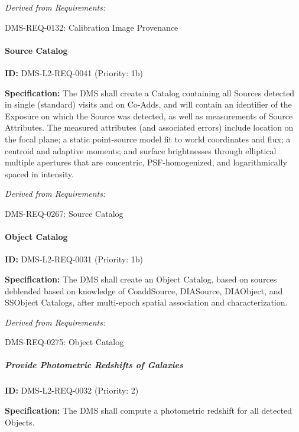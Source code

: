 \documentclass[SE,toc,lsstdraft]{lsstdoc}
\begin{document}
\emph{Derived from Requirements:}

DMS-REQ-0132:
Calibration Image Provenance \newline

\paragraph{Source Catalog}\hfill  %

\label{DMS-L2-REQ-0041}
\textbf{ID:} DMS-L2-REQ-0041 (Priority: 1b)

\textbf{Specification:} The DMS shall create a Catalog containing all Sources detected in single (standard) visits and on Co-Adds, and will contain an identifier of the Exposure on which the Source was detected, as well as measurements of Source Attributes. The measured attributes (and associated errors) include location on the focal plane; a static point-source model fit to world coordinates and flux; a centroid and adaptive moments; and surface brightnesses through elliptical multiple apertures that are concentric, PSF-homogenized, and logarithmically spaced in intensity.

\emph{Derived from Requirements:}

DMS-REQ-0267:
Source Catalog \newline

\paragraph{Object Catalog}\hfill  %

\label{DMS-L2-REQ-0031}
\textbf{ID:} DMS-L2-REQ-0031 (Priority: 1b)

\textbf{Specification:} The DMS shall create an Object Catalog, based on sources deblended based on knowledge of CoaddSource, DIASource, DIAObject, and SSObject Catalogs, after multi-epoch spatial association and characterization.

\emph{Derived from Requirements:}

DMS-REQ-0275:
Object Catalog \newline

\subparagraph{Provide Photometric Redshifts of Galaxies}\hfill  %

\label{DMS-L2-REQ-0032}
\textbf{ID:} DMS-L2-REQ-0032 (Priority: 2)

\textbf{Specification:} The DMS shall compute a photometric redshift for all detected Objects.
\end{document}
